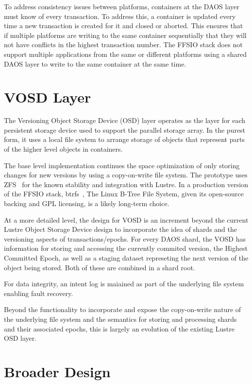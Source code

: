 \documentclass[conference]{IEEEtran}
\begin{document}
To address consistency issues between platforms, containers at the DAOS layer
must know of every transaction. To address this, a container is updated every
time a new transaction is created for it and closed or aborted. This ensures
that if multiple platforms are writing to the same container sequentially that
they will not have conflicts in the highest transaction number. The FFSIO stack
does not support multiple applications from the same or different platforms
using a shared DAOS layer to write to the same container at the same time.

\section{VOSD Layer}\label{sec:vosd}
The Versioning Object Storage Device (OSD) layer operates as the layer for each
persistent storage device used to support the parallel storage array. In the
purest form, it uses a local file system to arrange storage of objects that
represent parts of the higher level objects in containers.

The base level implementation continues the space optimization of only storing
changes for new versions by using a copy-on-write file system. The prototype
uses ZFS~\cite{zhang:2010:zfs} for the known stability and integration with
Lustre. In a production version of the FFSIO stack,
btrfs~\cite{rodeh:2013:btrfs}, The Linux B-Tree File System, given its
open-source backing and GPL licensing, is a likely long-term choice.

At a more detailed level, the design for VOSD is an increment beyond the
current Lustre Object Storage Device design to incorporate the idea of shards
and the versioning aspects of transactions/epochs. For every DAOS shard, the
VOSD has information for storing and accessing the currently commited version,
the Highest Committed Epoch, as well as a staging dataset represeting the
next version of the object being stored. Both of these are combined in a shard
root.

For data integrity, an intent log is maiained as part of the underlying file
system enabling fault recovery.

Beyond the functionality to incorporate and expose the copy-on-write nature
of the underlying file system and the semantics for storing and processing
shards and their associated epochs, this is largely an evolution of the
existing Lustre OSD layer.

\section{Broader Design}
\label{sec:broader}
\end{document}
